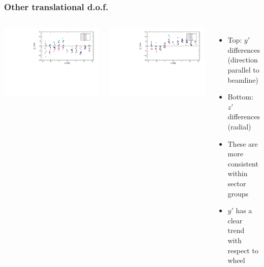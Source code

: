 \documentclass[compress]{beamer}
\begin{document}
\begin{frame}
\frametitle{Other translational d.o.f.}

\begin{columns}
\includegraphics[width=\linewidth]{NovHardwareADJUSTED_vs_y.pdf}

\includegraphics[width=\linewidth]{NovHardwareADJUSTED_vs_z.pdf}

\begin{itemize}
\item Top: $y'$ differences (direction parallel to beamline)

\item Bottom: $z'$ differences (radial)

\item These are more consistent within sector groups

\item $y'$ has a clear trend with respect to wheel
\end{itemize}
\end{columns}
\end{frame}
\end{document}
